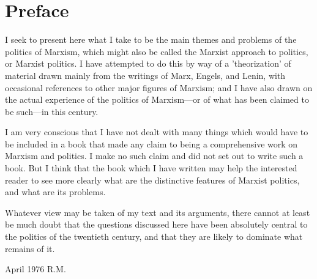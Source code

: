 \chapter*{Preface}
I seek to present here what I take to be the main themes and problems of the politics of Marxism, which might also be called the Marxist approach to politics, or Marxist politics. I have attempted to do this by way of a 'theorization' of material drawn mainly from the writings of Marx, Engels, and Lenin, with occasional references to other major figures of Marxism; and I have also drawn on the actual experience of the politics of Marxism—or of what has been claimed to be such—in this century.

I am very conscious that I have not dealt with many things which would have to be included in a book that made any claim to being a comprehensive work on Marxism and politics. I make no such claim and did not set out to write such a book. But I think that the book which I have written may help the interested reader to see more clearly what are the distinctive features of Marxist politics, and what are its problems.

Whatever view may be taken of my text and its arguments, there cannot at least be much doubt that the questions discussed here have been absolutely central to the politics of the twentieth century, and that they are likely to dominate what remains of it.

\noindent{}April 1976 \hfill R.M.


